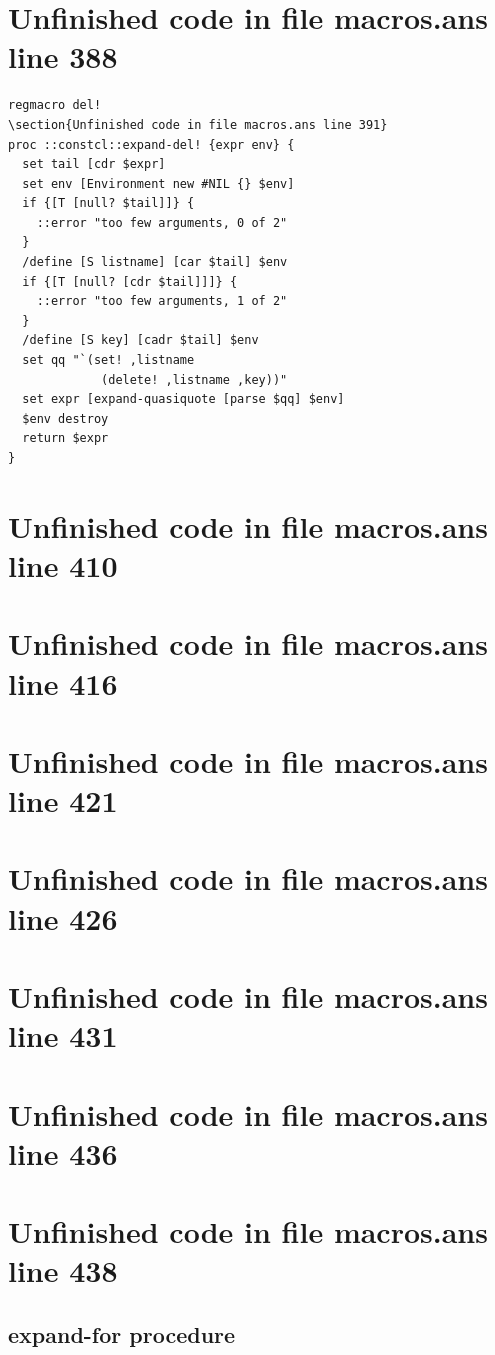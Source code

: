 \documentclass[twoside,9pt]{report}
\begin{document}
\section{Unfinished code in file macros.ans line 388}
\begin{lstlisting}
regmacro del!
\section{Unfinished code in file macros.ans line 391}
proc ::constcl::expand-del! {expr env} {
  set tail [cdr $expr]
  set env [Environment new #NIL {} $env]
  if {[T [null? $tail]]} {
    ::error "too few arguments, 0 of 2"
  }
  /define [S listname] [car $tail] $env
  if {[T [null? [cdr $tail]]]} {
    ::error "too few arguments, 1 of 2"
  }
  /define [S key] [cadr $tail] $env
  set qq "`(set! ,listname
             (delete! ,listname ,key))"
  set expr [expand-quasiquote [parse $qq] $env]
  $env destroy
  return $expr
}
\end{lstlisting}
\section{Unfinished code in file macros.ans line 410}
\section{Unfinished code in file macros.ans line 416}
\section{Unfinished code in file macros.ans line 421}
\section{Unfinished code in file macros.ans line 426}
\section{Unfinished code in file macros.ans line 431}
\section{Unfinished code in file macros.ans line 436}
\section{Unfinished code in file macros.ans line 438}
\subsection{expand-for procedure}
\label{expand-for-procedure}
\end{document}
